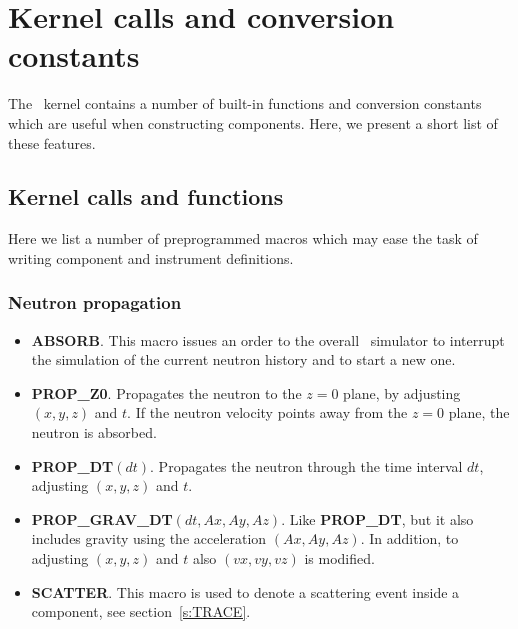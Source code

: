 
\chapter{Kernel calls and conversion constants}
\label{c:kernelcalls}
The \MCS\ kernel contains a number of built-in functions
and conversion constants which are useful when constructing
components. Here, we present a short list of these features.

\section{Kernel calls and functions}
Here we list a number of preprogrammed macros 
which may ease the task of writing component and instrument definitions.

\subsection{Neutron propagation}
\begin{itemize}
\item {\bf ABSORB}. This macro issues an order to the overall
  \MCS\ simulator to interrupt the simulation of the current neutron
  history and to start a new one.
\item {\bf PROP\_Z0}. Propagates the neutron to the $z=0$ plane,
  by adjusting $(x,y,z)$ and $t$. If the neutron velocity 
  points away from the $z=0$ plane, the neutron is absorbed.
\item {\bf PROP\_DT}$(dt)$. Propagates the neutron through the
  time interval $dt$, adjusting $(x,y,z)$ and $t$.
\item {\bf PROP\_GRAV\_DT}$(dt,Ax,Ay,Az)$. Like {\bf PROP\_DT}, but it also
  includes gravity using the acceleration $(Ax,Ay,Az)$. In addition,
  to adjusting $(x,y,z)$ and $t$ also $(vx,vy,vz)$ is modified.
\item {\bf SCATTER}. This macro is used to denote a scattering event
  inside a component, see section~\ref{s:TRACE}.
\end{itemize}

